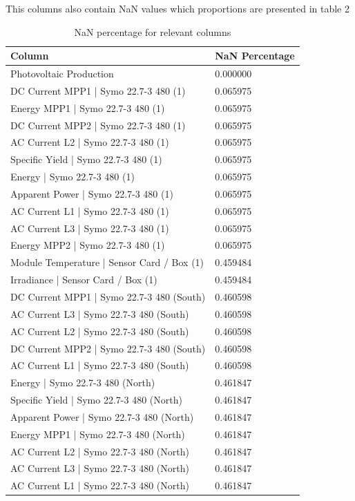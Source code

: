 \documentclass[a4paper,12pt]{article}
\begin{document}
This columns also contain NaN values which proportions are presented in table 2
\begin{table}[H] %
\centering
\caption{NaN percentage for relevant columns}
\begin{tabular}{ll}
\toprule
\textbf{Column} & \textbf{NaN Percentage} \\
\midrule
Photovoltaic Production & 0.000000 \\
DC Current MPP1 | Symo 22.7-3 480 (1) & 0.065975 \\
Energy MPP1 | Symo 22.7-3 480 (1) & 0.065975 \\
DC Current MPP2 | Symo 22.7-3 480 (1) & 0.065975 \\
AC Current L2 | Symo 22.7-3 480 (1) & 0.065975 \\
Specific Yield | Symo 22.7-3 480 (1) & 0.065975 \\
Energy | Symo 22.7-3 480 (1) & 0.065975 \\
Apparent Power | Symo 22.7-3 480 (1) & 0.065975 \\
AC Current L1 | Symo 22.7-3 480 (1) & 0.065975 \\
AC Current L3 | Symo 22.7-3 480 (1) & 0.065975 \\
Energy MPP2 | Symo 22.7-3 480 (1) & 0.065975 \\
Module Temperature | Sensor Card / Box (1) & 0.459484 \\
Irradiance | Sensor Card / Box (1) & 0.459484 \\
DC Current MPP1 | Symo 22.7-3 480 (South) & 0.460598 \\
AC Current L3 | Symo 22.7-3 480 (South) & 0.460598 \\
AC Current L2 | Symo 22.7-3 480 (South) & 0.460598 \\
DC Current MPP2 | Symo 22.7-3 480 (South) & 0.460598 \\
AC Current L1 | Symo 22.7-3 480 (South) & 0.460598 \\
Energy | Symo 22.7-3 480 (North) & 0.461847 \\
Specific Yield | Symo 22.7-3 480 (North) & 0.461847 \\
Apparent Power | Symo 22.7-3 480 (North) & 0.461847 \\
Energy MPP1 | Symo 22.7-3 480 (North) & 0.461847 \\
AC Current L2 | Symo 22.7-3 480 (North) & 0.461847 \\
AC Current L3 | Symo 22.7-3 480 (North) & 0.461847 \\
AC Current L1 | Symo 22.7-3 480 (North) & 0.461847 \\

\end{tabular}
\end{table}
\end{document}
